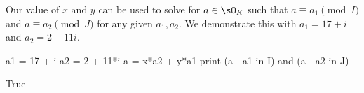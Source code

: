 Our value of $x$ and $y$ can be used to solve for $a \in \sO_K$ such that
$a \equiv a_1 \pmod{I}$ and $a \equiv a_2 \pmod{J}$ for any given $a_1,a_2$.
We demonstrate this with $a_1 = 17 + i$ and $a_2 = 2 + 11i$.
\begin{sagecode} %
\begin{sagecell}
a1 = 17 + i
a2 = 2 + 11*i
a = x*a2 + y*a1
print (a - a1 in I) and (a - a2 in J)
\end{sagecell}
\begin{sageout}
True
\end{sageout}
\end{sagecode}



\begin{comment}

\subsection{{\Sage}}


[[TODO]]

\subsection{\magma{}}
The \magma{} command {\tt ChineseRemainderTheorem} implements the
algorithm suggested by Theorem~\ref{thm:crt}.  In the following example,
we compute a prime over~$(3)$ and a prime over~$(5)$ of the ring of
integers of $\QQ(\sqrt[3]{2})$, and find an element of $\sO_K$ that is
congruent to $\sqrt[3]{2}$ modulo one prime and~$1$ modulo the other.
\begin{verbatim}
   > R<x> := PolynomialRing(RationalField());
   > K<a> := NumberField(x^3-2);
   > OK := RingOfIntegers(K);
   > I := Factorization(3*OK)[1][1];
   > J := Factorization(5*OK)[1][1];
   > I;
   Prime Ideal of OK
   Two element generators:
       [3, 0, 0]
       [4, 1, 0]
   > J;
   Prime Ideal of OK
   Two element generators:
       [5, 0, 0]
       [7, 1, 0]
   > b := ChineseRemainderTheorem(I, J, OK!a, OK!1);
   > K!b;
   -4
   > b - a in I;
   true
   > b - 1 in J;
   true
\end{verbatim}

\subsection{PARI}
There is also a CRT algorithm for number fields in PARI, but it
is more cumbersome to use.  First we defined $\QQ(\sqrt[3]{2})$
and factor the ideals $(3)$ and $(5)$.
\begin{verbatim}
   ? f = x^3 - 2;
   ? k = nfinit(f);
   ? i = idealfactor(k,3);
   ? j = idealfactor(k,5);
\end{verbatim}


\end{comment}
